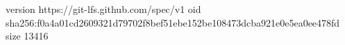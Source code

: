 version https://git-lfs.github.com/spec/v1
oid sha256:f0a4a01cd2609321d79702f8bef51ebe152be108473dcba921e0e5ea0ee478fd
size 13416
